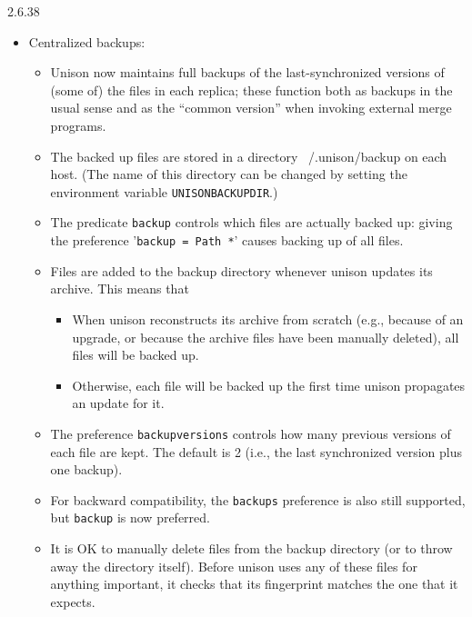 \begin{changesfromversion}{2.6.38}
\begin{itemize}
\item Centralized backups:
\begin{itemize}
  \item Unison now maintains full backups of the last-synchronized versions
      of (some of) the files in each replica; these function both as
      backups in the usual sense
      and as the ``common version'' when invoking external
      merge programs.
  \item The backed up files are stored in a directory ~/.unison/backup on each
      host.  (The name of this directory can be changed by setting
      the environment variable \verb|UNISONBACKUPDIR|.)
  \item The predicate \verb|backup| controls which files are actually
     backed up:
      giving the preference '\verb|backup = Path *|' causes backing up
      of all files.
  \item Files are added to the backup directory whenever unison updates
      its archive.  This means that
      \begin{itemize}
       \item When unison reconstructs its archive from scratch (e.g.,
           because of an upgrade, or because the archive files have
           been manually deleted), all files will be backed up.
       \item Otherwise, each file will be backed up the first time unison
           propagates an update for it.
      \end{itemize}
  \item The preference \verb|backupversions| controls how many previous
      versions of each file are kept.  The default is 2 (i.e., the last
      synchronized version plus one backup).
  \item For backward compatibility, the \verb|backups| preference is also
      still supported, but \verb|backup| is now preferred.
  \item It is OK to manually delete files from the backup directory (or to throw
      away the directory itself).  Before unison uses any of these files for
      anything important, it checks that its fingerprint matches the one
      that it expects.
\end{itemize}


\end{itemize}
\end{changesfromversion}
